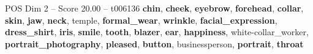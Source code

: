 \begin{textsample}{POS Dim 2 – Score 20.00 – t006136}  \label{ex:f2_pos_028}
\textbf{chin}, \textbf{cheek}, \textbf{eyebrow}, \textbf{forehead}, \textbf{collar}, \textbf{skin}, \textbf{jaw}, \textbf{neck}, temple, \textbf{formal\_wear}, \textbf{wrinkle}, \textbf{facial\_expression}, \textbf{dress\_shirt}, \textbf{iris}, \textbf{smile}, \textbf{tooth}, \textbf{blazer}, \textbf{ear}, \textbf{happiness}, white-collar\_worker, \textbf{portrait\_photography}, \textbf{pleased}, \textbf{button}, businessperson, \textbf{portrait}, \textbf{throat}

\end{textsample}
